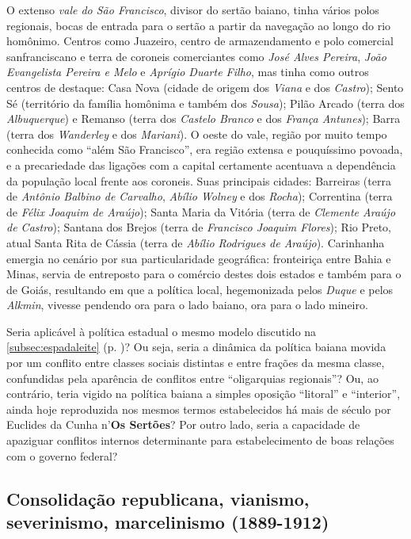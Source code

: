 O extenso \textit{vale do São Francisco}, divisor do sertão baiano, tinha vários polos regionais, bocas de entrada para o sertão a partir da navegação ao longo do rio homônimo. Centros como Juazeiro, centro de armazendamento e polo comercial sanfranciscano e terra de coroneis comerciantes como \textit{José Alves Pereira}, \textit{João Evangelista Pereira e Melo} e \textit{Aprígio Duarte Filho}, mas tinha como outros centros de destaque: Casa Nova (cidade de origem dos \textit{Viana} e dos \textit{Castro}); Sento Sé (território da família homônima e também dos \textit{Sousa}); Pilão Arcado (terra dos \textit{Albuquerque}) e Remanso (terra dos \textit{Castelo Branco} e dos \textit{França Antunes}); Barra (terra dos \textit{Wanderley} e dos \textit{Mariani}). O oeste do vale, região por muito tempo conhecida como ``além São Francisco'', era região extensa e pouquíssimo povoada, e a precariedade das ligações com a capital certamente acentuava a dependência da população local frente aos coroneis. Suas principais cidades: Barreiras (terra de \textit{Antônio Balbino de Carvalho}, \textit{Abílio Wolney} e dos \textit{Rocha}); Correntina (terra de \textit{Félix Joaquim de Araújo}); Santa Maria da Vitória (terra de \textit{Clemente Araújo de Castro}); Santana dos Brejos (terra de \textit{Francisco Joaquim Flores}); Rio Preto, atual Santa Rita de Cássia (terra de \textit{Abílio Rodrigues de Araújo}). Carinhanha emergia no cenário por sua particularidade geográfica: fronteiriça entre Bahia e Minas, servia de entreposto para o comércio destes dois estados e também para o de Goiás, resultando em que a política local, hegemonizada pelos \textit{Duque} e pelos \textit{Alkmin}, vivesse pendendo ora para o lado baiano, ora para o lado mineiro.

Seria aplicável à política estadual o mesmo modelo discutido na \autoref{subsec:espadaleite} (p. \pageref{subsec:espadaleite})? Ou seja, seria a dinâmica da política baiana movida por um conflito entre classes sociais distintas e entre frações da mesma classe, confundidas pela aparência de conflitos entre ``oligarquias regionais''? Ou, ao contrário, teria vigido na política baiana a simples oposição ``litoral'' e ``interior'', ainda hoje reproduzida nos mesmos termos estabelecidos há mais de século por Euclides da Cunha n'\textbf{Os Sertões}? Por outro lado, seria a capacidade de apaziguar conflitos internos determinante para estabelecimento de boas relações com o governo federal?

\subsection{Consolidação republicana, vianismo, severinismo, marcelinismo (1889-1912)}


